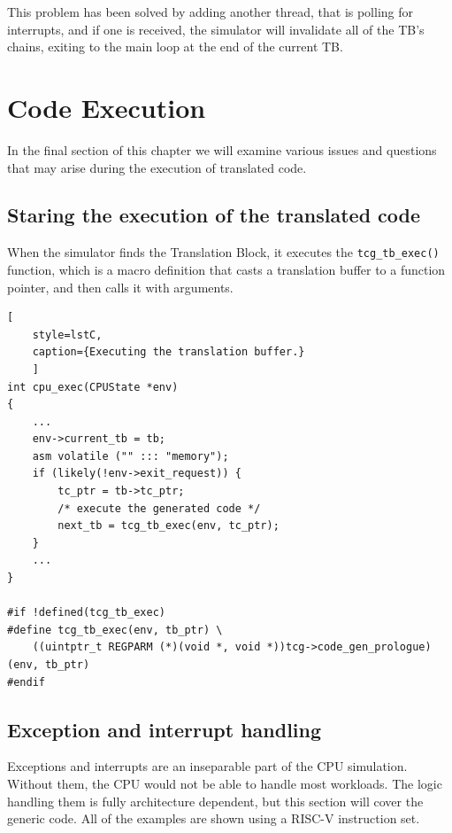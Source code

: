 This problem has been solved by adding another thread, that is polling for interrupts, and if one is received, the
simulator will invalidate all of the TB's chains, exiting to the main loop at the end of the current TB.

\pagebreak

\section{Code Execution}

In the final section of this chapter we will examine various issues and questions that may arise during the execution
of translated code.

\subsection{Staring the execution of the translated code}

When the simulator finds the Translation Block, it executes the \texttt{tcg\_tb\_exec()} function, which is a
macro definition that casts a translation buffer to a function pointer, and then calls it with arguments.

\begin{lstlisting}[
    style=lstC,
    caption={Executing the translation buffer.}
    ]
int cpu_exec(CPUState *env)
{
    ...
    env->current_tb = tb;
    asm volatile ("" ::: "memory");
    if (likely(!env->exit_request)) {
        tc_ptr = tb->tc_ptr;
        /* execute the generated code */
        next_tb = tcg_tb_exec(env, tc_ptr);
    }
    ...
}

#if !defined(tcg_tb_exec)
#define tcg_tb_exec(env, tb_ptr) \
    ((uintptr_t REGPARM (*)(void *, void *))tcg->code_gen_prologue)(env, tb_ptr)
#endif
\end{lstlisting}

\subsection{Exception and interrupt handling}

Exceptions and interrupts are an inseparable part of the CPU simulation. Without them, the CPU would not be able to
handle most workloads. The logic handling them is fully architecture dependent, but this section will cover the
generic code. All of the examples are shown using a RISC-V instruction set.

